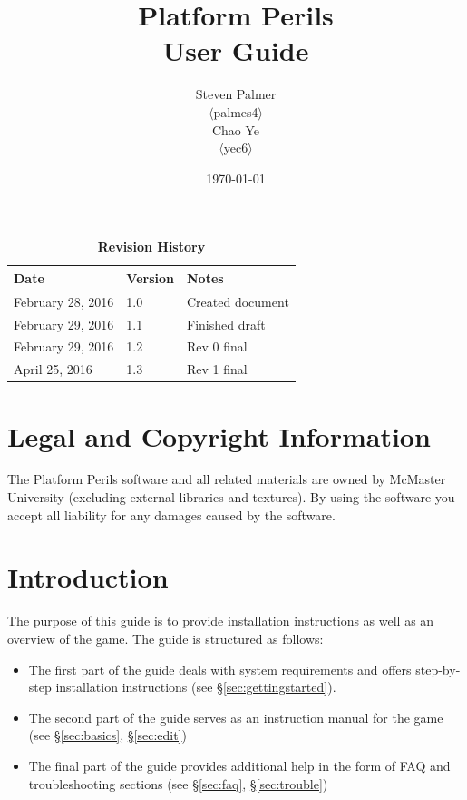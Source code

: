 \documentclass[12pt, titlepage]{article}
\begin{document}
\title{\bf Platform Perils\\[\baselineskip]\Large User Guide}
\author{Steven Palmer\\$\langle$palmes4$\rangle$\\Chao Ye\\$\langle$yec6$\rangle$}
\date{\today}
	
\maketitle

\tableofcontents
\listoftables
\listoffigures


\begin{table}[t]
\caption*{\bf Revision History}
\begin{tabularx}{\textwidth}{p{3.5cm}p{2cm}X}
\toprule {\bf Date} & {\bf Version} & {\bf Notes}\\
\midrule
February 28, 2016 & 1.0 & Created document\\
February 29, 2016 & 1.1 & Finished draft\\
February 29, 2016 & 1.2 & Rev 0 final\\
April 25, 2016 & 1.3 & Rev 1 final\\
\bottomrule
\end{tabularx}
\end{table}

\newpage


\section{Legal and Copyright Information}
The Platform Perils software and all related materials are owned by McMaster University (excluding external libraries and textures).  By using the software you accept all liability for any damages caused by the software.

\section{Introduction}
The purpose of this guide is to provide installation instructions as well as an overview of the game.  The guide is structured as follows:

\begin{itemize}
  \item The first part of the guide deals with system requirements and offers step-by-step installation instructions (see \hyperref[sec:gettingstarted]{\S\ref*{sec:gettingstarted}}).
  \item The second part of the guide serves as an instruction manual for the game (see \hyperref[sec:basics]{\S\ref*{sec:basics}}, \hyperref[sec:edit]{\S\ref*{sec:edit}})
  \item The final part of the guide provides additional help in the form of FAQ and troubleshooting sections (see \hyperref[sec:faq]{\S\ref*{sec:faq}}, \hyperref[sec:trouble]{\S\ref*{sec:trouble}})
\end{itemize}
\end{document}
